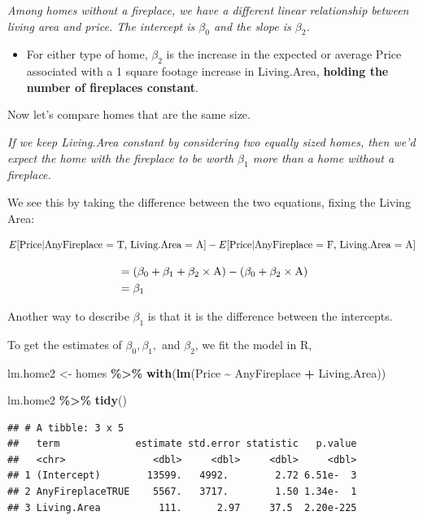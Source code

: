 \documentclass[
]{book}
\newenvironment{Shaded}{\begin{snugshade}}{\end{snugshade}}
\newcommand{\FunctionTok}[1]{\textcolor[rgb]{0.13,0.29,0.53}{\textbf{#1}}}
\newcommand{\NormalTok}[1]{#1}
\newcommand{\OtherTok}[1]{\textcolor[rgb]{0.56,0.35,0.01}{#1}}
\newcommand{\SpecialCharTok}[1]{\textcolor[rgb]{0.81,0.36,0.00}{\textbf{#1}}}
\providecommand{\tightlist}{%
  \setlength{\itemsep}{0pt}\setlength{\parskip}{0pt}}
\begin{document}
\emph{Among homes without a fireplace, we have a different linear relationship between living area and price. The intercept is \(\beta_0\) and the slope is \(\beta_2\).}

\begin{itemize}
\tightlist
\item
  For either type of home, \(\beta_2\) is the increase in the expected or average Price associated with a 1 square footage increase in Living.Area, \textbf{holding the number of fireplaces constant}.
\end{itemize}

Now let's compare homes that are the same size.

\emph{If we keep Living.Area constant by considering two equally sized homes, then we'd expect the home with the fireplace to be worth \(\beta_1\) more than a home without a fireplace.}

We see this by taking the difference between the two equations, fixing the Living Area:

\[E[\hbox{Price}| \hbox{AnyFireplace = T, Living.Area = A}] - E[\hbox{Price}| \hbox{AnyFireplace = F, Living.Area = A}]\]

\begin{align*}
\,&= (\beta_0+\beta_1 + \beta_2 \times \hbox{A}) - ( \beta_0 + \beta_2 \times \hbox{A})\\
\,&= \beta_1
\end{align*}

Another way to describe \(\beta_1\) is that it is the difference between the intercepts.

To get the estimates of \(\beta_0,\beta_1,\) and \(\beta_2\), we fit the model in R,

\begin{Shaded}
\begin{Highlighting}[]
\NormalTok{lm.home2 }\OtherTok{\textless{}{-}}\NormalTok{ homes }\SpecialCharTok{\%\textgreater{}\%}
  \FunctionTok{with}\NormalTok{(}\FunctionTok{lm}\NormalTok{(Price }\SpecialCharTok{\textasciitilde{}}\NormalTok{ AnyFireplace }\SpecialCharTok{+}\NormalTok{ Living.Area))}

\NormalTok{lm.home2 }\SpecialCharTok{\%\textgreater{}\%} 
  \FunctionTok{tidy}\NormalTok{()}
\end{Highlighting}
\end{Shaded}

\begin{verbatim}
## # A tibble: 3 x 5
##   term             estimate std.error statistic   p.value
##   <chr>               <dbl>     <dbl>     <dbl>     <dbl>
## 1 (Intercept)        13599.   4992.        2.72 6.51e-  3
## 2 AnyFireplaceTRUE    5567.   3717.        1.50 1.34e-  1
## 3 Living.Area          111.      2.97     37.5  2.20e-225
\end{verbatim}
\end{document}
